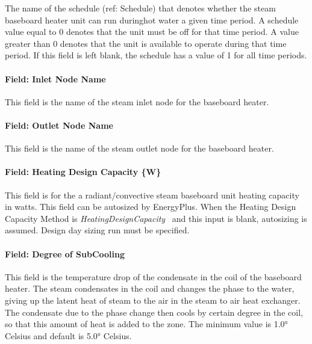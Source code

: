 The name of the schedule (ref: Schedule) that denotes whether the steam baseboard heater unit can run duringhot water a given time period. A schedule value equal to 0 denotes that the unit must be off for that time period. A value greater than 0 denotes that the unit is available to operate during that time period. If this field is left blank, the schedule has a value of 1 for all time periods.

\paragraph{Field: Inlet Node Name}\label{field-inlet-node-name-1-003}

This field is the name of the steam inlet node for the baseboard heater.

\paragraph{Field: Outlet Node Name}\label{field-outlet-node-name-1-004}

This field is the name of the steam outlet node for the baseboard heater.

\paragraph{Field: Heating Design Capacity \{W\}}\label{field-heating-design-capacity-w-1-000}

This field is for the a radiant/convective steam baseboard unit heating capacity in watts. This field can be autosized by EnergyPlus. When the Heating Design Capacity Method is \emph{HeatingDesignCapacity}~ and this input is blank, autosizing is assumed. Design day sizing run must be specified.

\paragraph{Field: Degree of SubCooling}\label{field-degree-of-subcooling-000}

This field is the temperature drop of the condensate in the coil of the baseboard heater. The steam condensates in the coil and changes the phase to the water, giving up the latent heat of steam to the air in the steam to air heat exchanger. The condensate due to the phase change then cools by certain degree in the coil, so that this amount of heat is added to the zone. The minimum value is 1.0° Celsius and default is 5.0° Celsius.

